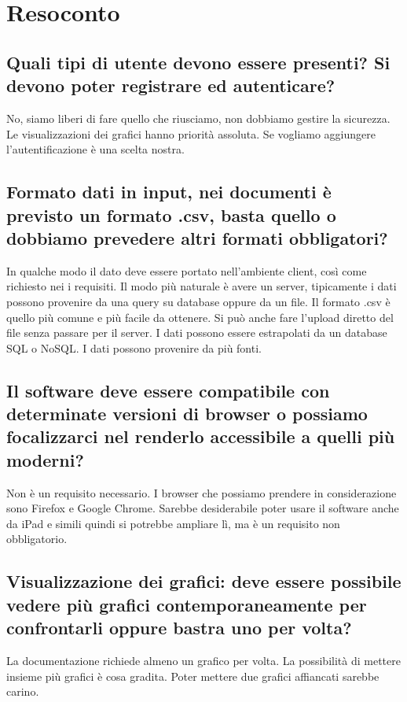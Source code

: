 \documentclass{article}
\begin{document}
\section{Resoconto}
\label{sec:resoconto}

	\subsection{Quali tipi di utente devono essere presenti? Si devono poter registrare ed autenticare?}
	\label{sub:domanda_01}
    No, siamo liberi di fare quello che riusciamo, non dobbiamo gestire la sicurezza. Le visualizzazioni dei grafici hanno priorità assoluta. Se vogliamo aggiungere l'autentificazione è una scelta nostra.
    
    \subsection{Formato dati in input, nei documenti è previsto un formato .csv, basta quello o dobbiamo prevedere altri formati obbligatori?}
	\label{sub:domanda_02}
    In qualche modo il dato deve essere portato nell'ambiente client, così come richiesto nei i requisiti. Il modo più naturale è avere un server, tipicamente i dati possono provenire da una query su database oppure da un file. Il formato .csv è quello più comune e più facile da ottenere. Si può anche fare l'upload diretto del file senza passare per il server. I dati possono essere estrapolati da un database SQL o NoSQL. I dati possono provenire da più fonti.

    \subsection{Il software deve essere compatibile con determinate versioni di browser o possiamo focalizzarci nel renderlo accessibile a quelli più moderni?}
    \label{sub:domanda_03}
    Non è un requisito necessario. I browser che possiamo prendere in considerazione sono Firefox e Google Chrome. Sarebbe desiderabile poter usare il software anche da iPad e simili quindi si potrebbe ampliare lì, ma è un requisito non obbligatorio.

    \subsection{Visualizzazione dei grafici: deve essere possibile vedere più grafici contemporaneamente per confrontarli oppure bastra uno per volta?}
    \label{sub:domanda_04}
    La documentazione richiede almeno un grafico per volta. La possibilità di mettere insieme più grafici è cosa gradita. Poter mettere due grafici affiancati sarebbe carino.
\end{document}
